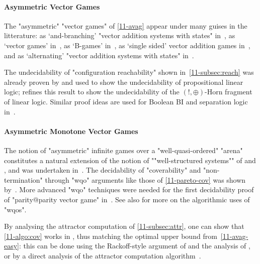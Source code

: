 \paragraph{Asymmetric Vector Games}
The "asymmetric" "vector games" of \cref{11-avag} appear
under many guises in the litterature: as `and-branching' "vector
addition systems with states"
in~\cite{Lincoln&Mitchell&Scedrov&Shankar:1992}, as `vector games'
in~\cite{Kanovich:1995}, as `B-games'
in~\cite{Raskin&Samuelides&VanBegin:2005}, as `single sided' vector
addition games in~\cite{Abdulla&al:2013}, and as `alternating'
"vector addition systems with states" in~\cite{Courtois&Schmitz:2014}.

The undecidability of "configuration reachability" shown
in~\cref{11-subsec:reach} was already proven by  and used to show the
undecidability of propositional linear logic;
 refines this result to
show the undecidability of the $(!,\oplus)$-Horn fragment of linear
logic.  Similar proof ideas are used for Boolean BI and separation
logic in~\cite{Larchey&Galmiche:2013,Brotherston&Kanovich:2014}.

\paragraph{Asymmetric Monotone Vector Games}
The notion of "asymmetric" infinite games over a "well-quasi-ordered"
"arena" constitutes a natural extension of the notion of
""well-structured systems"" of
\citet{Abdulla&Cerans&Jonsson&Tsay:2000} and
\citet{Finkel&Schnoebelen:2001}, and was undertaken
in~\cite{Abdulla&Bouajjani&dOrso:2003,Raskin&Samuelides&VanBegin:2005}.
The decidability of "coverability" and "non-termination" through "wqo"
arguments like those of \cref{11-pareto-cov} was shown
by~.  More
advanced "wqo" techniques were needed for the first decidability proof
of "parity@parity vector game" in~\cite{Abdulla&al:2013}.  See
also \cite{Schmitz&Schnoebelen:2012} for more on the algorithmic uses of
"wqos".

By analysing the attractor computation of \cref{11-subsec:attr}, one can
show that \cref{11-algo:cov} works in \kEXP[2], thus matching the
optimal upper bound from~\cref{11-avag-easy}: this can be done using
the Rackoff-style argument of \citet{Courtois&Schmitz:2014} and the
analysis of \citet{Bozzelli&Ganty:2011}, or by a direct analysis of the
attractor computation algorithm~\cite{Lazic&Schmitz:2019}.

